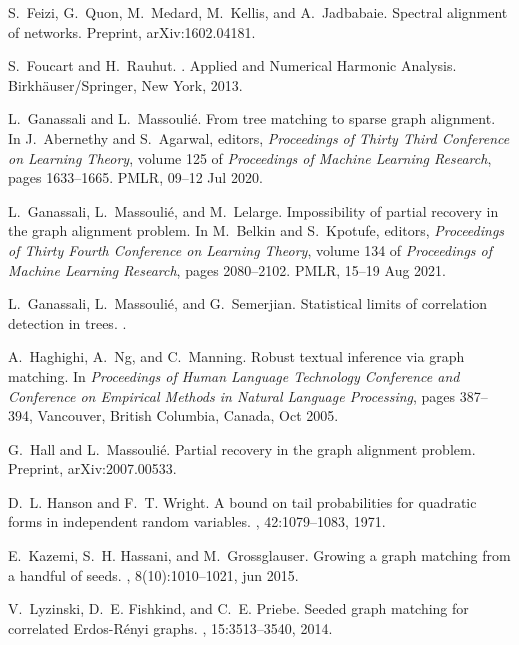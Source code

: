\documentclass[11pt]{article}
\numberwithin{equation}{section}
\begin{document}
\begin{thebibliography}{10}
S.~Feizi, G.~Quon, M.~Medard, M.~Kellis, and A.~Jadbabaie.
\newblock Spectral alignment of networks.
\newblock Preprint, arXiv:1602.04181.

S.~Foucart and H.~Rauhut.
.
\newblock Applied and Numerical Harmonic Analysis. Birkh\"{a}user/Springer, New York, 2013.

L.~Ganassali and L.~Massouli\'e.
\newblock From tree matching to sparse graph alignment.
\newblock In J.~Abernethy and S.~Agarwal, editors, {\em Proceedings of Thirty Third Conference on Learning Theory}, volume 125 of {\em Proceedings of Machine Learning Research}, pages 1633--1665. PMLR, 09--12 Jul 2020.

L.~Ganassali, L.~Massouli\'e, and M.~Lelarge.
\newblock Impossibility of partial recovery in the graph alignment problem.
\newblock In M.~Belkin and S.~Kpotufe, editors, {\em Proceedings of Thirty Fourth Conference on Learning Theory}, volume 134 of {\em Proceedings of Machine Learning Research}, pages 2080--2102. PMLR, 15--19 Aug 2021.

L.~Ganassali, L.~Massouli\'e, and G.~Semerjian.
\newblock Statistical limits of correlation detection in trees.
.

A.~Haghighi, A.~Ng, and C.~Manning.
\newblock Robust textual inference via graph matching.
\newblock In {\em Proceedings of Human Language Technology Conference and Conference on Empirical Methods in Natural Language Processing}, pages 387--394, Vancouver, British Columbia, Canada, Oct 2005.

G.~Hall and L.~Massouli\'e.
\newblock Partial recovery in the graph alignment problem.
\newblock Preprint, arXiv:2007.00533.

D.~L. Hanson and F.~T. Wright.
\newblock A bound on tail probabilities for quadratic forms in independent random variables.
, 42:1079--1083, 1971.

E.~Kazemi, S.~H. Hassani, and M.~Grossglauser.
\newblock Growing a graph matching from a handful of seeds.
, 8(10):1010--1021, jun 2015.

V.~Lyzinski, D.~E. Fishkind, and C.~E. Priebe.
\newblock Seeded graph matching for correlated {E}rdos-{R}\'{e}nyi graphs.
, 15:3513--3540, 2014.


\end{thebibliography}
\end{document}
